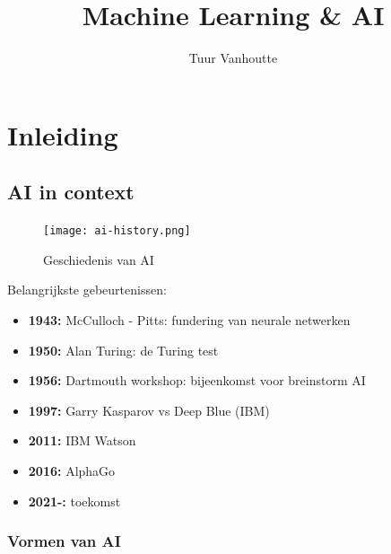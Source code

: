 \documentclass{article}
\begin{document}
\begin{titlepage}
    \author{Tuur Vanhoutte}
    \title{Machine Learning \& AI}
\end{titlepage}

\maketitle
\newpage
\tableofcontents
\newpage


\section{Inleiding}

\subsection{AI in context}

\begin{figure}[H]
    \centering
    \texttt{[image: ai-history.png]}
    \caption{Geschiedenis van AI}
\end{figure}

Belangrijkste gebeurtenissen:

\begin{itemize}
    \item \textbf{1943:} McCulloch - Pitts: fundering van neurale netwerken
    \item \textbf{1950:} Alan Turing: de Turing test
    \item \textbf{1956:} Dartmouth workshop: bijeenkomst voor breinstorm AI
    \item \textbf{1997:} Garry Kasparov vs Deep Blue (IBM)
    \item \textbf{2011:} IBM Watson
    \item \textbf{2016:} AlphaGo
    \item \textbf{2021-:} toekomst
\end{itemize}

\subsubsection{Vormen van AI}
\end{document}
